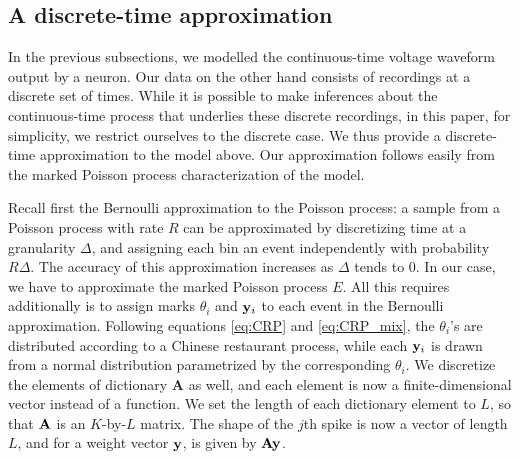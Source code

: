 
\subsection{A discrete-time approximation}
In the previous subsections, we modelled the continuous-time voltage waveform output by a neuron. Our data on the other hand consists of recordings
at a discrete set of times. While it is possible to make inferences about the continuous-time process that underlies these discrete recordings,
in this paper, for simplicity, we restrict ourselves to the discrete case. We thus provide a discrete-time approximation to the model above. 
Our approximation follows easily from the marked Poisson process characterization of the model.

Recall first the Bernoulli approximation to the Poisson process: a sample from a Poisson process with rate $R$ can be approximated by discretizing
time at a granularity $\Delta$, and assigning each bin an event independently with probability $R\Delta$. The accuracy of this approximation increases 
as $\Delta$ tends to $0$.
%
In our case, we have to approximate the marked Poisson process $E$. All this requires additionally is to assign marks $\theta_i$ and $\mathbf{y}_i$ to each event 
in the Bernoulli approximation. Following equations \eqref{eq:CRP} and \eqref{eq:CRP_mix}, the $\theta_i$'s are distributed according
to a Chinese restaurant process, while each $\mathbf{y}_i$ is drawn from a normal distribution parametrized by the corresponding $\theta_i$. We discretize the 
elements of dictionary $\mathbf{A}$ as well, and each element is now a finite-dimensional vector instead of a function. We set the length of each
dictionary element to $L$, so that $\mathbf{A}$ is an $K$-by-$L$ matrix. The shape of the $j$th spike is now a vector of length $L$, and for a weight vector
$\mathbf{y}$, is given by $\mathbf{A} \mathbf{y}$.


